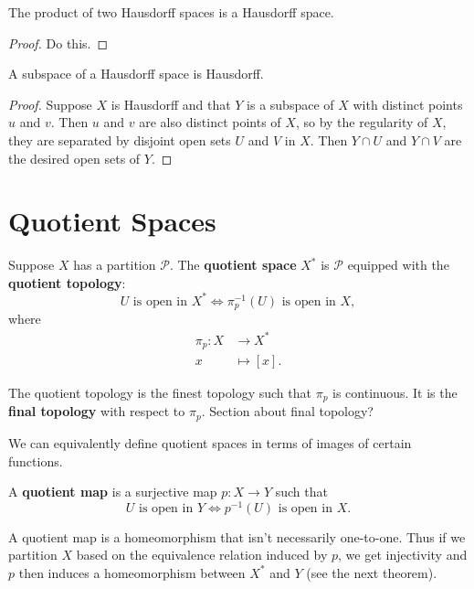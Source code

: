 \documentclass[twoside,10pt]{report}
\begin{document}
\begin{prop}
	The product of two Hausdorff spaces is a Hausdorff space.
\end{prop}
\begin{proof}
	{\color{red}Do this.}
\end{proof}

\begin{prop}
	A subspace of a Hausdorff space is Hausdorff.
\end{prop}
\begin{proof}
	Suppose $X$ is Hausdorff and that $Y$ is a subspace of $X$ with distinct points $u$ and $v$. Then $u$ and $v$ are also distinct points of $X$, so by the regularity of $X$, they are separated by disjoint open sets $U$ and $V$ in $X$. Then $Y \cap U$ and $Y \cap V$ are the desired open sets of $Y$.
\end{proof}



\section{Quotient Spaces}

\begin{defn}[]
Suppose $X$ has a partition $\mathcal{P}$. The \textbf{quotient space} $X^{*}$ is $\mathcal{P}$ equipped with the \textbf{quotient topology}:
\[
	U \text{ is open in } X^{*} \iff \pi_{p}^{-1}(U) \text{ is open in } X,
\] where
\begin{align*}
	\pi_{p}:X&\to X^{*}\\
	x&\mapsto [x].
\end{align*}
\end{defn}

\begin{note}[]
	The quotient topology is the finest topology such that $\pi_{p}$ is continuous. It is the \textbf{final topology} with respect to $\pi_{p}$. {\color{red}Section about final topology?}
\end{note}

We can equivalently define quotient spaces in terms of images of certain functions.

\begin{defn}[]
A \textbf{quotient map} is a surjective map $p:X\to Y$ such that
\[
	U \text{ is open in } Y \iff p^{-1}(U) \text{ is open in } X.
\] 
\end{defn}

A quotient map is a homeomorphism that isn't necessarily one-to-one. Thus if we partition $X$ based on the equivalence relation induced by $p$, we get injectivity and $p$ then induces a homeomorphism between $X^{*}$ and $Y$ (see the next theorem).
\end{document}
